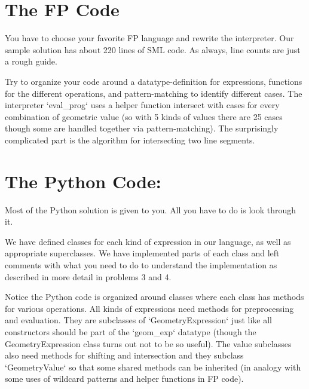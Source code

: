 \documentclass[a4paper,12pt]{article}
\begin{document}
\section*{The FP Code}
You have to choose your favorite FP language and rewrite the interpreter. Our sample solution has about 220 lines of SML code. As always, line counts are just a rough guide.

Try to organize your code around a datatype-definition for expressions, functions for the different operations, and pattern-matching to identify different cases. The interpreter `eval\_prog` uses a helper function intersect with cases for every combination of geometric value (so with 5 kinds of values there are 25 cases though some are handled together via pattern-matching). The surprisingly complicated part is the algorithm for intersecting two line segments.

\section*{The Python Code:}
Most of the Python solution is given to you. All you have to do is look through it.

We have defined classes for each kind of expression in our language, as well as appropriate superclasses. We have implemented parts of each class and left comments with what you need to do to understand the implementation as described in more detail in problems 3 and 4.

Notice the Python code is organized around classes where each class has methods for various operations. All kinds of expressions need methods for preprocessing and evaluation. They are subclasses of `GeometryExpression` just like all constructors should be part of the `geom\_exp` datatype (though the GeometryExpression class turns out not to be so useful). The value subclasses also need methods for shifting and intersection and they subclass `GeometryValue` so that some shared methods can be inherited (in analogy with some uses of wildcard patterns and helper functions in FP code).
\end{document}
